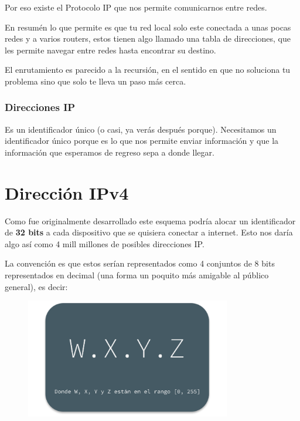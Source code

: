 \documentclass[12pt, fleqn]{report}                             %
\theoremstyle{break}                                            %
\begin{document}
            Por eso existe el Protocolo IP que nos permite comunicarnos entre redes.

            En resumén lo que permite es que tu red local solo este conectada a unas pocas redes y a
            varios routers, estos tienen algo llamado una tabla de direcciones, que les permite navegar
            entre redes hasta encontrar su destino. 

            El enrutamiento es parecido a la recursión, en el sentido en que no soluciona tu problema
            sino que solo te lleva un paso más cerca.


            \subsubsection{Direcciones IP}

                Es un identificador único (o casi, ya verás después porque). Necesitamos
                un identificador único porque es lo que nos permite enviar información y que 
                la información que esperamos de regreso sepa a donde llegar.



        \clearpage
        \section{Dirección IPv4}

            Como fue originalmente desarrollado este esquema podría alocar un identificador
            de \textbf{32 bits} a cada dispositivo que se quisiera conectar a internet.
            Esto nos daría algo así como 4 mill millones de posibles direcciones IP.

            La convención es que estos serían representados como 4 conjuntos de 8 bits representados
            en decimal (una forma un poquito más amigable al público general), es decir:

            \begin{figure}[h]
                \centering
                \includegraphics[width=0.80\textwidth]{IPv4}
            \end{figure}
\end{document}
